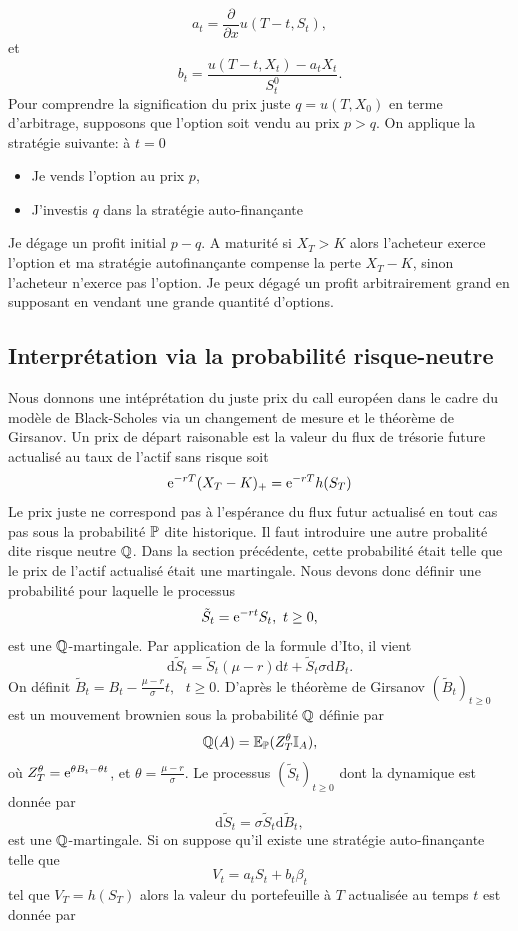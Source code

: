 $$
a_t = \frac{\partial}{\partial x}u(T-t, S_t),
$$
et 
$$
b_t = \frac{u(T-t, X_t) - a_t X_t}{S^0_t}.
$$
Pour comprendre la signification du prix juste $q = u(T, X_0)$ en terme d'arbitrage, supposons que l'option soit vendu au prix $p>q$. On applique la stratégie suivante: à $t=0$
\begin{itemize}
    \item Je vends l'option au prix $p$, 
    \item J'investis $q$ dans la stratégie auto-finançante
\end{itemize}
Je dégage un profit initial $p-q$. A maturité si $X_T> K$ alors l'acheteur exerce l'option et ma stratégie autofinançante compense la perte $X_T-K$, sinon l'acheteur n'exerce pas l'option. Je peux dégagé un profit arbitrairement grand en supposant en vendant une grande quantité d'options.
\subsection{Interprétation via la probabilité risque-neutre}
Nous donnons une intéprétation du juste prix du call européen dans le cadre du modèle de Black-Scholes via un changement de mesure et le théorème de Girsanov. Un prix de départ raisonable est la valeur du flux de trésorie future actualisé au taux de l'actif sans risque soit
$$
\mathrm{e}^{-rT}(X_T - K)_+ = \mathrm{e}^{-rT}h(S_T)
$$
Le prix juste ne correspond pas à l'espérance du flux futur actualisé en tout cas pas sous la probabilité $\mathbb{P}$ dite historique. Il faut introduire une autre probalité dite risque neutre $\mathbb{Q}$. Dans la section précédente, cette probabilité était telle que le prix de l'actif actualisé était une martingale. Nous devons donc définir une probabilité pour laquelle le processus 
$$
\tilde{S}_t = \mathrm{e}^{-rt}S_t,\text{ }t\geq 0,
$$
est une $\mathbb{Q}$-martingale. Par application de la formule d'Ito, il vient 
$$
\text{d}\tilde{S}_t = \tilde{S}_t (\mu- r)\text{d}t + \tilde{S}_t \sigma\text{d}B_t.
$$
On définit $\tilde{B}_t = B_t - \frac{\mu - r}{\sigma}t,\text{ }t\geq0$. D'après le théorème de Girsanov $(\tilde{B}_t)_{t\geq 0}$ est un mouvement brownien sous la probabilité $\mathbb{Q}$ définie par 
$$
\mathbb{Q}(A) = \mathbb{E}_{\mathbb{P}}(Z_T^\theta\mathbb{I}_A),
$$
où $Z_T^\theta = \mathrm{e}^{\theta B_t  - \theta t}$, et $\theta = \frac{\mu - r}{\sigma}.$ Le processus $(\tilde{S}_t)_{t\geq 0}$ dont la dynamique est donnée par 
$$
\text{d}\tilde{S}_t = \sigma\tilde{S}_t\text{d}\tilde{B}_t,
$$
est une $\mathbb{Q}$-martingale. Si on suppose qu'il existe une stratégie auto-finançante telle que 
$$
V_t = a_t S_t + b_t\beta_t
$$
tel que $V_T = h(S_T)$ alors la valeur du portefeuille à $T$ actualisée au temps $t$ est donnée par 
